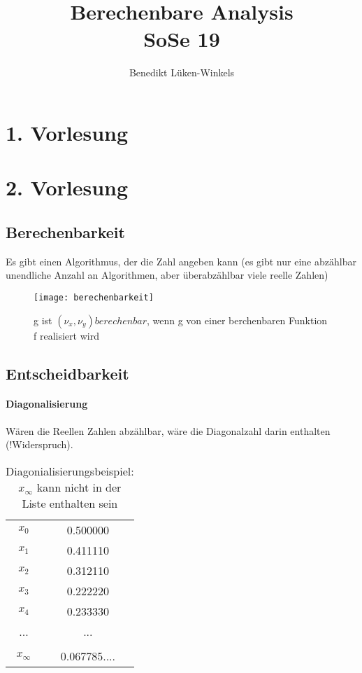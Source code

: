 \documentclass[ngerman]{scrartcl}
\title{Berechenbare Analysis \\ SoSe 19}
\author{Benedikt Lüken-Winkels}
\begin{document}
\maketitle
\tableofcontents
\newpage


\section{1. Vorlesung}
\section{2. Vorlesung}
\subsection{Berechenbarkeit}
Es gibt einen Algorithmus, der die Zahl angeben kann (es gibt nur eine abzählbar unendliche Anzahl an Algorithmen, aber überabzählbar viele reelle Zahlen)
\begin{figure}[h!]
  \centering
  \caption{ g ist $ (\nu_x, \nu_y) berechenbar $, wenn g von einer berchenbaren Funktion f realisiert wird}
  \texttt{[image: berechenbarkeit]}
\end{figure}
\subsection{Entscheidbarkeit}
\paragraph{Diagonalisierung} Wären die Reellen Zahlen abzählbar, wäre die Diagonalzahl darin enthalten (!Widerspruch).
\begin{table}[h!]
  \caption{Diagonialisierungsbeispiel: $ x_\infty $ kann nicht in der Liste enthalten sein}
  \label{tab:diagonal}
  \begin{center}
    \begin{tabular}{cc}
       $ x_0 $ & 0.500000 \\
       $ x_1 $ & 0.411110 \\
       $ x_2 $ & 0.312110 \\
       $ x_3 $ & 0.222220 \\
       $ x_4 $ & 0.233330 \\
       ... & ... \\
       \hline\\
       $ x_\infty $ & 0.067785....
    \end{tabular}
  \end{center}
\end{table}
\end{document}
